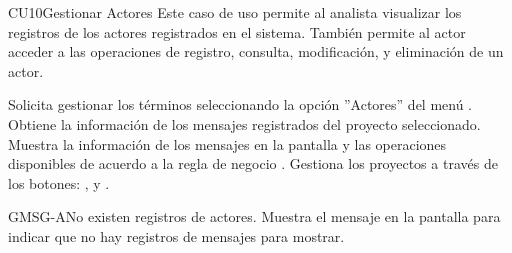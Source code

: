 	\begin{UseCase}{CU10}{Gestionar Actores}{
	Este caso de uso permite al analista visualizar los registros de los actores registrados en el sistema. También permite al actor acceder a las operaciones de registro, consulta, modificación, y eliminación de un actor.
	}
\end{UseCase}
\begin{UCtrayectoria}
	\UCpaso[\UCactor] Solicita gestionar los términos seleccionando la opción ''Actores'' del menú .
	\UCpaso[\UCsist] Obtiene la información de los mensajes registrados del proyecto seleccionado. 
	\UCpaso[\UCsist] Muestra la información de los mensajes en la pantalla  y las operaciones disponibles de acuerdo a la regla de negocio .
	\UCpaso[\UCactor] Gestiona los proyectos a través de los botones: , \editar y \eliminar. \label{CU10-P4}
\end{UCtrayectoria}		
\begin{UCtrayectoriaA}{GMSG-A}{No existen registros de actores.}
	\UCpaso[\UCsist] Muestra el mensaje  en la pantalla  para indicar que no hay registros de mensajes para mostrar.
\end{UCtrayectoriaA}

